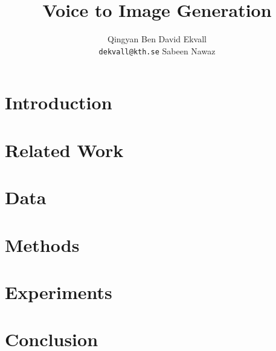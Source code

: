 \documentclass{article}
\title{Voice to Image Generation}
\author{%
  Qingyan Ben \And David Ekvall \\ \texttt{dekvall@kth.se} \And Sabeen Nawaz
}
\begin{document}
\maketitle
\begin{abstract}

\end{abstract}
\section{Introduction}


\section{Related Work}


\section{Data}


\section{Methods}


\section{Experiments}


\section{Conclusion}


\printbibliography
\end{document}
